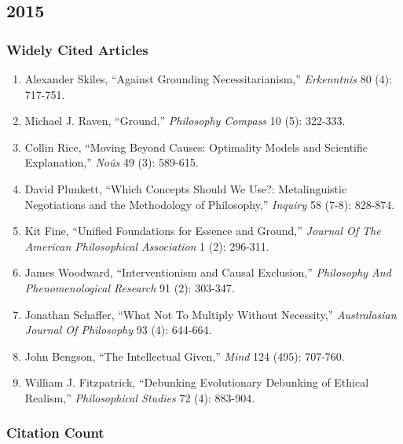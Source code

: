 \documentclass[
  10pt,
  letterpaper,
  DIV=11,
  numbers=noendperiod,
  twoside]{scrartcl}
\providecommand{\tightlist}{%
  \setlength{\itemsep}{0pt}\setlength{\parskip}{0pt}}\usepackage{longtable,booktabs,array}
\begin{document}
\newpage

\subsection{2015}\label{sec-s2015}

\subsubsection*{Widely Cited Articles}\label{widely-cited-articles-39}

\begin{enumerate}
\def\labelenumi{\arabic{enumi}.}
\tightlist
\item
  Alexander Skiles, ``Against Grounding Necessitarianism,''
  \emph{Erkenntnis} 80 (4): 717-751.
\item
  Michael J. Raven, ``Ground,'' \emph{Philosophy Compass} 10 (5):
  322-333.
\item
  Collin Rice, ``Moving Beyond Causes: Optimality Models and Scientific
  Explanation,'' \emph{Noûs} 49 (3): 589-615.
\item
  David Plunkett, ``Which Concepts Should We Use?: Metalinguistic
  Negotiations and the Methodology of Philosophy,'' \emph{Inquiry} 58
  (7-8): 828-874.
\item
  Kit Fine, ``Unified Foundations for Essence and Ground,''
  \emph{Journal Of The American Philosophical Association} 1 (2):
  296-311.
\item
  James Woodward, ``Interventionism and Causal Exclusion,''
  \emph{Philosophy And Phenomenological Research} 91 (2): 303-347.
\item
  Jonathan Schaffer, ``What Not To Multiply Without Necessity,''
  \emph{Australasian Journal Of Philosophy} 93 (4): 644-664.
\item
  John Bengson, ``The Intellectual Given,'' \emph{Mind} 124 (495):
  707-760.
\item
  William J. Fitzpatrick, ``Debunking Evolutionary Debunking of Ethical
  Realism,'' \emph{Philosophical Studies} 72 (4): 883-904.
\end{enumerate}

\subsubsection*{Citation Count}\label{sec-count-2015}
\end{document}
